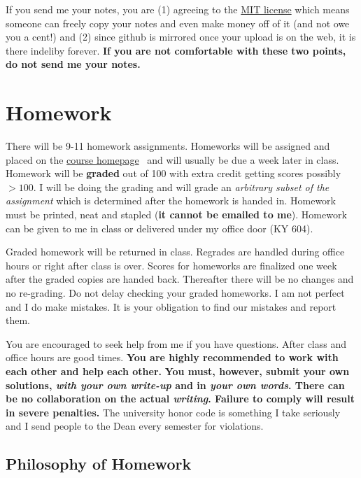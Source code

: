 \documentclass[12pt]{article}
\newcommand{\ingreen}[1]{\color{green}\textbf{#1} \color{black}}
\newcommand{\inred}[1]{\color{red}\textbf{#1} \color{black}}
\newcommand{\coursewebpage}{\href{https://github.com/kapelner/QC_Math_341_Spring_2019}{course homepage}}
\begin{document}
If you send me your notes, you are (1) agreeing to the \href{https://github.com/kapelner/QC_Math_390.4_Spring_2020/blob/master/LICENSE}{MIT license} which means someone can freely copy your notes and even make money off of it (and not owe you a cent!) and (2) since github is mirrored once your upload is on the web, it is there indeliby forever. \inred{If you are not comfortable with these two points, do not send me your notes.}

\section*{Homework}

There will be 9-11 homework assignments. Homeworks will be assigned and placed on the \coursewebpage~ and will usually be due a week later in class. Homework will be \textbf{graded} out of 100 with extra credit getting scores possibly $> 100$. I will be doing the grading and will grade an \textit{arbitrary subset of the assignment} which is determined after the homework is handed in. Homework must be printed, neat and stapled (\textbf{it cannot be emailed to me}). Homework can be given to me in class or delivered under my office door (KY 604).

Graded homework will be returned in class. Regrades are handled during office hours or right after class is over. Scores for homeworks are finalized one week after the graded copies are handed back. Thereafter there will be no changes and no re-grading. Do not delay checking your graded homeworks. I am not perfect and I do make mistakes. It is your obligation to find our mistakes and report them.

You are encouraged to seek help from me if you have questions. After class and office hours are good times. \ingreen{You are highly recommended to work with each other and help each other.} \inred{You must, however, submit your own solutions, \textit{with your own write-up} and in \textit{your own words}. There can be no collaboration on the actual \textit{writing}. Failure to comply will result in severe penalties.} The university honor code is something I take seriously and I send people to the Dean every semester for violations.

\subsection*{Philosophy of Homework}
\end{document}
